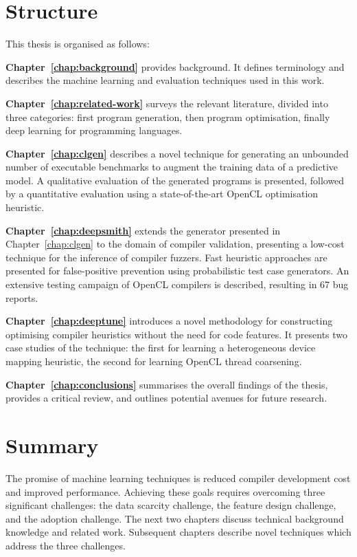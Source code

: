 \begin{itemize}
\end{itemize}

\newpage
\section{Structure}

This thesis is organised as follows:

\textbf{Chapter~\ref{chap:background}} provides background. It defines terminology and describes the machine learning and evaluation techniques used in this work.

\textbf{Chapter~\ref{chap:related-work}} surveys the relevant literature, divided into three categories: first program generation, then program optimisation, finally deep learning for programming languages.

\textbf{Chapter~\ref{chap:clgen}} describes a novel technique for generating an unbounded number of executable benchmarks to augment the training data of a predictive model. A qualitative evaluation of the generated programs is presented, followed by a quantitative evaluation using a state-of-the-art OpenCL optimisation heuristic.

\textbf{Chapter~\ref{chap:deepsmith}} extends the generator presented in Chapter~\ref{chap:clgen} to the domain of compiler validation, presenting a low-cost technique for the inference of compiler fuzzers. Fast heuristic approaches are presented for false-positive prevention using probabilistic test case generators. An extensive testing campaign of OpenCL compilers is described, resulting in 67 bug reports.

\textbf{Chapter~\ref{chap:deeptune}} introduces a novel methodology for constructing optimising compiler heuristics without the need for code features. It presents two case studies of the technique: the first for learning a heterogeneous device mapping heuristic, the second for learning OpenCL thread coarsening.

\textbf{Chapter~\ref{chap:conclusions}} summarises the overall findings of the thesis, provides a critical review, and outlines potential avenues for future research.


\section{Summary}

The promise of machine learning techniques is reduced compiler development cost and improved performance. Achieving these goals requires overcoming three significant challenges: the data scarcity challenge, the feature design challenge, and the adoption challenge. The next two chapters discuss technical background knowledge and related work. Subsequent chapters describe novel techniques which address the three challenges.
